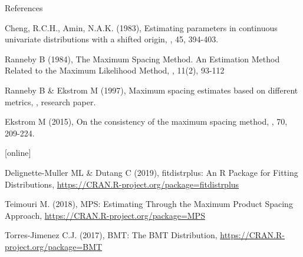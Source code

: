\documentclass[8pt, hide notes]{beamer}
\begin{document}
\begin{frame}{References}
    
  
  \begin{thebibliography}{1}
 \begin{footnotesize}
 
 
  
  
  \beamertemplatearticlebibitems
	
Cheng, R.C.H., Amin, N.A.K. (1983),
  \newblock Estimating parameters in continuous univariate distributions with a shifted origin,
  , 45, 394-403.
	
  
Ranneby B (1984),
  \newblock The Maximum Spacing Method. An Estimation Method Related to the Maximum Likelihood Method,
  , 11(2),  93-112 

Ranneby B \& Ekstrom M (1997), 
\newblock Maximum spacing estimates based on different metrics, 
  ,  research paper.	

  

  
Ekstrom M (2015), 
\newblock On the consistency of the maximum spacing method, 
  , 70, 209-224.	
  
  
  
[online]



Delignette-Muller ML \& Dutang C (2019), 
\newblock   fitdistrplus: An R Package for Fitting Distributions,
\newblock \url{https://CRAN.R-project.org/package=fitdistrplus}

 Teimouri M. (2018), 
\newblock  MPS: Estimating Through the Maximum Product Spacing Approach,
\newblock \url{https://CRAN.R-project.org/package=MPS}


Torres-Jimenez C.J. (2017), 
\newblock  BMT: The BMT Distribution,
\newblock \url{https://CRAN.R-project.org/package=BMT}


  

     
  \end{footnotesize}
\end{thebibliography}
  
   
\end{frame}

%
%
%
%
%
%
%
%
%
%
%
%
%



\end{document}
